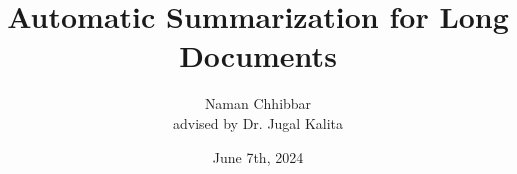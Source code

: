 \documentclass{beamer}
\title[Long Document Summarization]{Automatic Summarization for Long Documents}
\author[Naman Chhibbar]{
  Naman Chhibbar \\
  \scriptsize advised by Dr. Jugal Kalita
}
\institute{University of Colorado, Colorado Springs}
\date{June 7th, 2024}
\begin{document}
\begin{frame}
  \titlepage
\end{frame}





\end{document}

